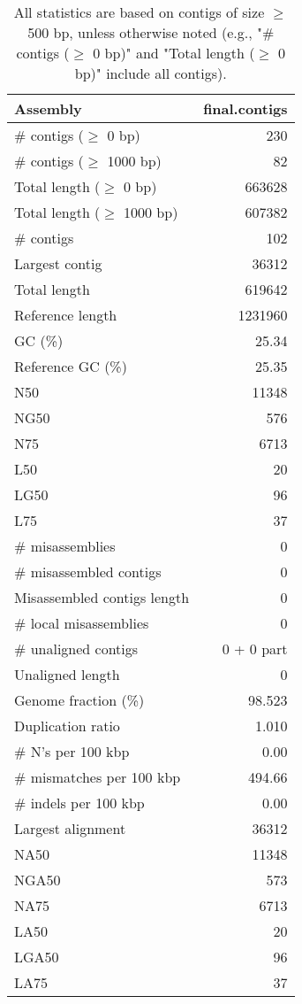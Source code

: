 \documentclass[12pt,a4paper]{article}
\begin{document}
\begin{table}[ht]
\begin{center}
\caption{All statistics are based on contigs of size $\geq$ 500 bp, unless otherwise noted (e.g., "\# contigs ($\geq$ 0 bp)" and "Total length ($\geq$ 0 bp)" include all contigs).}
\begin{tabular}{|l*{1}{|r}|}
\hline
Assembly & final.contigs \\ \hline
\# contigs ($\geq$ 0 bp) & 230 \\ \hline
\# contigs ($\geq$ 1000 bp) & 82 \\ \hline
Total length ($\geq$ 0 bp) & 663628 \\ \hline
Total length ($\geq$ 1000 bp) & 607382 \\ \hline
\# contigs & 102 \\ \hline
Largest contig & 36312 \\ \hline
Total length & 619642 \\ \hline
Reference length & 1231960 \\ \hline
GC (\%) & 25.34 \\ \hline
Reference GC (\%) & 25.35 \\ \hline
N50 & 11348 \\ \hline
NG50 & 576 \\ \hline
N75 & 6713 \\ \hline
L50 & 20 \\ \hline
LG50 & 96 \\ \hline
L75 & 37 \\ \hline
\# misassemblies & 0 \\ \hline
\# misassembled contigs & 0 \\ \hline
Misassembled contigs length & 0 \\ \hline
\# local misassemblies & 0 \\ \hline
\# unaligned contigs & 0 + 0 part \\ \hline
Unaligned length & 0 \\ \hline
Genome fraction (\%) & 98.523 \\ \hline
Duplication ratio & 1.010 \\ \hline
\# N's per 100 kbp & 0.00 \\ \hline
\# mismatches per 100 kbp & 494.66 \\ \hline
\# indels per 100 kbp & 0.00 \\ \hline
Largest alignment & 36312 \\ \hline
NA50 & 11348 \\ \hline
NGA50 & 573 \\ \hline
NA75 & 6713 \\ \hline
LA50 & 20 \\ \hline
LGA50 & 96 \\ \hline
LA75 & 37 \\ \hline
\end{tabular}
\end{center}
\end{table}
\end{document}
